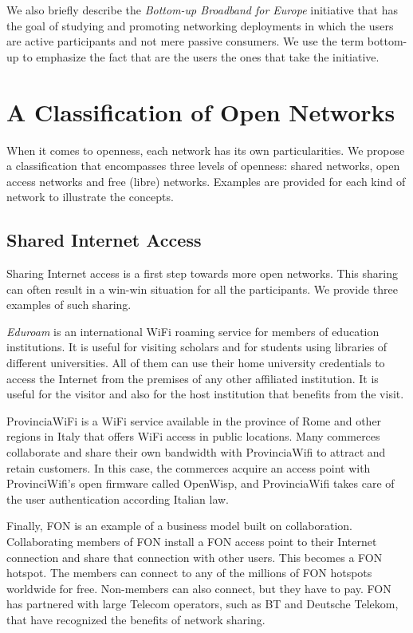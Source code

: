 \documentclass[journal]{IEEEtran}
\begin{document}
We also briefly describe the \emph{Bottom-up Broadband for Europe} initiative that has the goal of studying and promoting networking deployments in which the users are active participants and not mere passive consumers.
We use the term bottom-up to emphasize the fact that are the users the ones that take the initiative.


\section{A Classification of Open Networks}

When it comes to openness, each network has its own particularities.
We propose a classification that encompasses three levels of openness: shared networks, open access networks and free (libre) networks.
Examples are provided for each kind of network to illustrate the concepts.

\subsection{Shared Internet Access}

Sharing Internet access is a first step towards more open networks.
This sharing can often result in a win-win situation for all the participants.
We provide three examples of such sharing.

\emph{Eduroam} is an international WiFi roaming service for members of education institutions.
It is useful for visiting scholars and for students using libraries of different universities.
All of them can use their home university credentials to access the Internet from the premises of any other affiliated institution.
It is useful for the visitor and also for the host institution that benefits from the visit.

ProvinciaWiFi is a WiFi service available in the province of Rome and other regions in Italy that offers WiFi access in public locations.
Many commerces collaborate and share their own bandwidth with ProvinciaWifi to attract and retain customers.
In this case, the commerces acquire an access point with ProvinciWifi's open firmware called OpenWisp, and ProvinciaWifi takes care of the user authentication according Italian law.

Finally, FON is an example of a business model built on collaboration.
Collaborating members of FON install a FON access point to their Internet connection and share that connection with other users.
This becomes a FON hotspot.
The members can connect to any of the millions of FON hotspots worldwide for free.
Non-members can also connect, but they have to pay.
FON has partnered with large Telecom operators, such as BT and Deutsche Telekom, that have recognized the benefits of network sharing.
\end{document}
